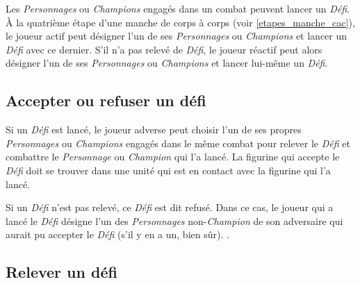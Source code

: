Les \emph{Personnages} ou \emph{Champions} engagés dans un combat peuvent lancer un \emph{Défi}. À la quatrième étape d'une manche de corps à corps (voir \ref{etapes_manche_cac}), le joueur actif peut désigner l'un de ses \emph{Personnages} ou \emph{Champions} et lancer un \emph{Défi} avec ce dernier. S'il n'a pas relevé de \emph{Défi}, le joueur réactif peut alors désigner l'un de ses \emph{Personnages} ou \emph{Champions} et lancer lui-même un \emph{Défi}.

\subsection{Accepter ou refuser un défi}

Si un \emph{Défi} est lancé, le joueur adverse peut choisir l'un de ses propres \emph{Personnages} ou \emph{Champions} engagés dans le même combat pour relever le \emph{Défi} et combattre le \emph{Personnage} ou \emph{Champion} qui l'a lancé. La figurine qui accepte le \emph{Défi} doit se trouver dans une unité qui est en contact avec la figurine qui l'a lancé.

Si un \emph{Défi} n'est pas relevé, ce \emph{Défi} est dit refusé. Dans ce cas, le joueur qui a lancé le \emph{Défi} désigne l'un des \emph{Personnages} non-\emph{Champion} de son adversaire qui aurait pu accepter le \emph{Défi} (s'il y en a un, bien sûr). .

\subsection{Relever un défi}

